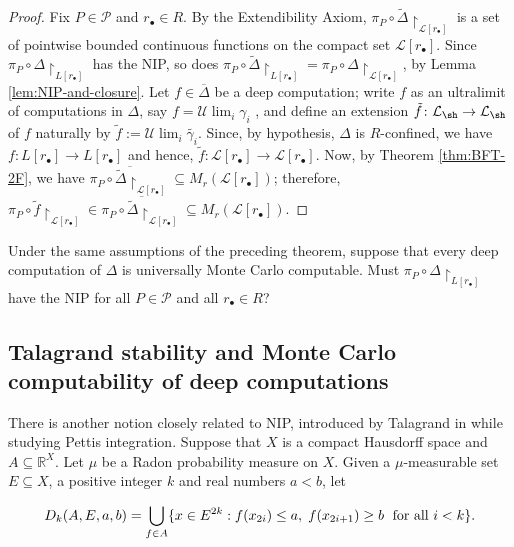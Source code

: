 \begin{proof}
    Fix $P\in\mathcal{P}$ and $r_\bullet\in R$.
    By the Extendibility Axiom, $\pi_P\circ\tilde\Delta\restriction_{\mathcal{L}[r_\bullet]}$ is a set of pointwise bounded continuous functions on the compact set $\mathcal{L}[r_\bullet]$.
    Since $\pi_P\circ\Delta\restriction_{L[r_\bullet]}$ has the NIP, so does $\pi_P\circ\tilde\Delta\restriction_{L[r_\bullet]}=\pi_P\circ\Delta\restriction_{\mathcal{L}[r_\bullet]}$, by Lemma \ref{lem:NIP-and-closure}.
    Let $f\in\overline{\Delta}$ be a deep computation;
     write $f$ as an ultralimit of computations in $\Delta$, say $f=\mathcal{U}\lim_i\gamma_i$ , and
    define an extension $\tilde{f}\colon\mathcal{L}_{\sh}\to \mathcal{L}_{\sh}$ of $f$ naturally by $\tilde{f}:=\mathcal{U}\lim_i\tilde{\gamma_i}$.
    Since, by hypothesis, $\Delta$ is $R$-confined, we have $f\colon L[r_\bullet]\to L[r_\bullet]$ and hence, $\tilde{f}\colon\mathcal{L}[r_\bullet]\to \mathcal{L}[r_\bullet]$.
    Now, by Theorem \ref{thm:BFT-2F}, we have $\overline{\pi_P\circ\tilde\Delta\restriction_{\mathcal{L}[r_\bullet]}}\subseteq M_r(\mathcal{L}[r_\bullet])$; therefore, $\pi_P \circ \tilde{f}\restriction_{\mathcal{L}[r_\bullet]}\in \overline{\pi_P\circ\tilde\Delta\restriction_{\mathcal{L}[r_\bullet]}}\subseteq M_r(\mathcal{L}[r_\bullet])$.
\end{proof}

\begin{question}
    Under the same assumptions of the preceding theorem, suppose that every deep computation of $\Delta$ is universally Monte Carlo computable.
    Must $\pi_P\circ\Delta\restriction_{L[r_\bullet]}$ have the NIP for all $P\in\mathcal{P}$ and all $r_{\bullet}\in R$?
\end{question}

\subsection{Talagrand stability and Monte Carlo computability of deep computations}

There is another notion closely related to NIP, introduced by Talagrand in \cite{talagrand1984pettis} while studying Pettis integration.
Suppose that $X$ is a compact Hausdorff space and $A\subseteq \mathbb{R}^X$.
Let $\mu$ be a Radon probability measure on $X$.
Given a $\mu$-measurable set $E\subseteq X$, a positive integer $k$ and real numbers $a<b$, let

\[
	D_k(A,E,a,b)=\bigcup_{f\in A}\{x\in E^{2k}:f(x_{2i})\leq a, \hspace{1mm} f(x_{2i+1})\geq b \hspace{1mm}{\text{ for all }i<k} \}.
\]

